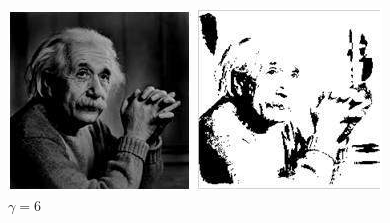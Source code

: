 \documentclass[a4paper, 12pt]{article}
\begin{document}
\begin{figure}[!htb]
		\includegraphics[width=\linewidth]{images/einsteinEscuro.jpg}
		\caption{$\gamma = 8$}
  	\endminipage\hspace{1cm}
	  	\includegraphics[width=\linewidth]{images/claro.jpg}
	  	\caption{$\gamma = 6$}
	\endminipage
\end{figure}
\end{document}
